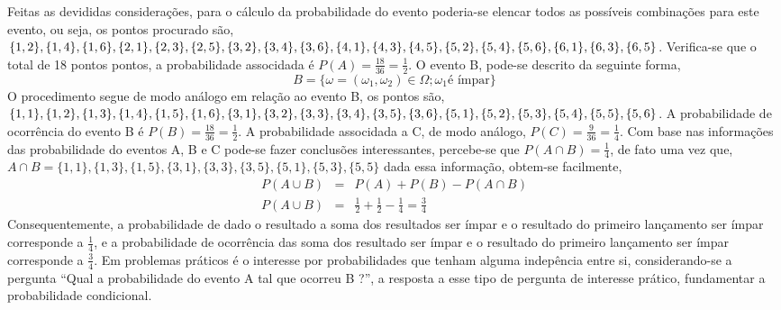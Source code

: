   Feitas as devididas considera\c{c}\~{o}es, para o c\'{a}lculo da probabilidade do evento poderia-se elencar todos as poss\'{i}veis
  combina\c{c}\~{o}es para este evento, ou seja, os pontos procurado s\~{a}o, $\{1,2 \},\{1,4 \},\{1,6 \}, \{2,1 \}, \{2, 3\}, \{2,5 \}
  ,\{3,2 \}, \{3,4 \}, \{3,6 \}, \{4,1 \}, \{4,3 \}, \{4,5 \}, \\ \{5,2 \},\{5,4 \},  \{5,6 \}, \{6,1 \}, \{6, 3 \}, \{6, 5 \}$.
  Verifica-se que o total de 18 pontos pontos, a probabilidade associdada \'{e} $P(A) = \frac{18} {36}  = \frac{1} {2}$.
  O evento B, pode-se descrito da seguinte forma,
  \begin{equation*}
	B = \{\omega = (\omega_1, \omega_2) \in \Omega; \omega_1 \textrm {\'{e} \'{i}mpar} \}
  \end{equation*}
  O procedimento segue de modo an\'{a}logo em rela\c{c}\~{a}o ao evento B, os pontos  s\~{a}o,
  $\{1,1 \},\{1,2 \},\{1,3 \}, \{1,4 \}, \{1, 5\}, \{1,6 \},\{3,1 \},\{3,2 \},\{3,3 \}, \{3,4 \}, \{3, 5\}, \{3,6 \}, \\
  \{5,1 \},\{5,2 \},\{5,3 \}, \{5,4 \}, \{5, 5\}, \{5,6 \}$.
  A probabilidade de ocorr\^{e}ncia do evento B \'{e} $P(B) = \frac{18} {36} = \frac {1} {2} $. A probabilidade associdada a C, 
  de modo an\'{a}logo, $P(C) = \frac{9}{36} = \frac {1} {4}$. Com base nas informa\c{c}\~{o}es das probabilidade do eventos
  A, B e C pode-se fazer conclus\~{o}es interessantes, percebe-se que
  $P(A \cap B) = \frac{1} {4}$, de fato uma vez que, $A \cap B = \{1,1 \},\{1,3 \},\{1,5 \}, \{3,1 \}, \{3,3 \},\{3,5 \},
  \{5,1 \}, \{5,3 \},\{5, 5 \}$ 
  dada essa informa\c{c}\~{a}o, obtem-se facilmente,
  \begin{eqnarray*}
	P(A \cup B) &=&  P(A) + P(B) -P(A \cap B) \\ \nonumber
	P(A \cup B) &=&  \frac{1} {2} + \frac{1} {2} - \frac{1} {4} = \frac{3} {4} 	
  \end{eqnarray*}
  Consequentemente, a probabilidade de dado o resultado a soma dos resultados ser \'{i}mpar e o resultado do primeiro lan\c{c}amento ser
  \'{i}mpar corresponde a $\frac{1} {4}$, e a probabilidade de ocorr\^{e}ncia das soma dos resultado ser \'{i}mpar e o
  resultado do primeiro lan\c{c}amento ser \'{i}mpar corresponde a $\frac{3} {4}$. Em problemas pr\'{a}ticos \'{e} o interesse
  por probabilidades que tenham alguma indep\^{e}ncia entre si, considerando-se a pergunta ``Qual a probabilidade do evento
  A tal que ocorreu B ?'', a resposta a esse tipo de pergunta de interesse pr\'{a}tico, fundamentar a probabilidade condicional.

